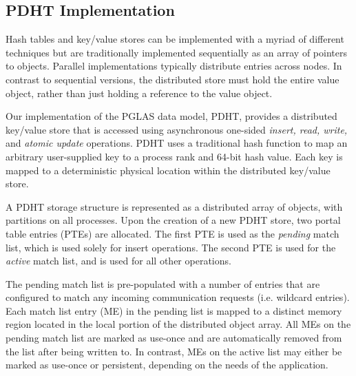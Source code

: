 \subsection{PDHT Implementation}

Hash tables and key/value stores can be implemented with a myriad of different
techniques but are traditionally implemented sequentially as an array of
pointers to objects.  Parallel implementations typically distribute entries
across nodes. In contrast to sequential versions, the distributed store must
hold the entire value object, rather than just holding a reference to the value
object.



Our implementation of the PGLAS data model, PDHT, provides a distributed
key/value store that is accessed using asynchronous one-sided {\em insert,
  read, write,} and {\em atomic update} operations. PDHT uses a traditional
hash function\cite{cityhash} to map an arbitrary user-supplied key to a process
rank and 64-bit hash value. Each key is mapped to a deterministic physical
location within the distributed key/value store.

A PDHT storage structure is represented as a distributed array of objects, with
partitions on all processes. Upon the creation of a new PDHT store, two portal
table entries (PTEs) are allocated. The first PTE is used as the {\em pending}
match list, which is used solely for insert operations.  The second PTE is used
for the {\em active} match list, and is used for all other operations. 

The pending match list is pre-populated with a number of entries that are
configured to match any incoming communication requests (i.e. wildcard
entries). Each match list entry (ME) in the pending list is mapped to a
distinct memory region located in the local portion of the distributed object
array. All MEs on the pending match list are marked as use-once and are
automatically removed from the list after being written to. In contrast, MEs on
the active list may either be marked as use-once or persistent, depending on
the needs of the application.

